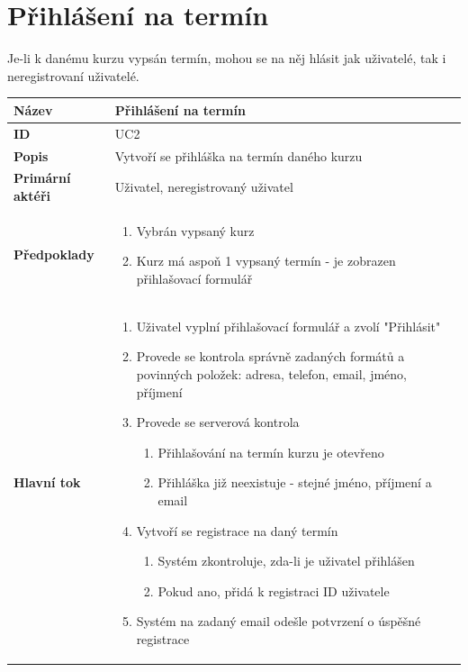 \documentclass[12pt,a4paper,titlepage,final]{report}
\begin{document}
\section{Přihlášení na termín}
Je-li k danému kurzu vypsán termín, mohou se na něj hlásit jak uživatelé, tak i neregistrovaní uživatelé.
\begin{table}[!h]
\begin{center}
    \begin{tabular}{ | p{4.5cm} | p{13cm} | }
    \hline
    \textbf{Název} & Přihlášení na termín 
    \\ \hline
    
	\textbf{ID} & UC2
	\\ \hline
	
	\textbf{Popis} & Vytvoří se přihláška na termín daného kurzu
	\\ \hline
	    
	\textbf{Primární aktéři} & Uživatel, neregistrovaný uživatel
	\\ \hline
	
	\textbf{Předpoklady} & 
	\vspace{-3.5mm}
	\begin{enumerate}
		\itemsep0em 	
		\item Vybrán vypsaný kurz
		\item Kurz má aspoň 1 vypsaný termín - je zobrazen přihlašovací formulář
	\end{enumerate}
    \\ \hline
    
    \textbf{Hlavní tok} & 
    \vspace{-3.5mm}
	\begin{enumerate}
		\itemsep0em 	
		\item Uživatel vyplní přihlašovací formulář a zvolí "Přihlásit"
		\item Provede se kontrola správně zadaných formátů a povinných položek: adresa, telefon, email, jméno, příjmení
		\item Provede se serverová kontrola
		\begin{enumerate}
			\itemsep0em 		
			\item Přihlašování na termín kurzu je otevřeno
			\item Přihláška již neexistuje - stejné jméno, příjmení a email
		\end{enumerate}				
		\item Vytvoří se registrace na daný termín
		\begin{enumerate}
			\itemsep0em 		
			\item Systém zkontroluje, zda-li je uživatel přihlášen
			\item Pokud ano, přidá k registraci ID uživatele
		\end{enumerate}				
		\item Systém na zadaný email odešle potvrzení o úspěšné registrace
	\end{enumerate}   		
    \\ \hline
    	   

\end{tabular}
\end{center}
\end{table}
\end{document}
